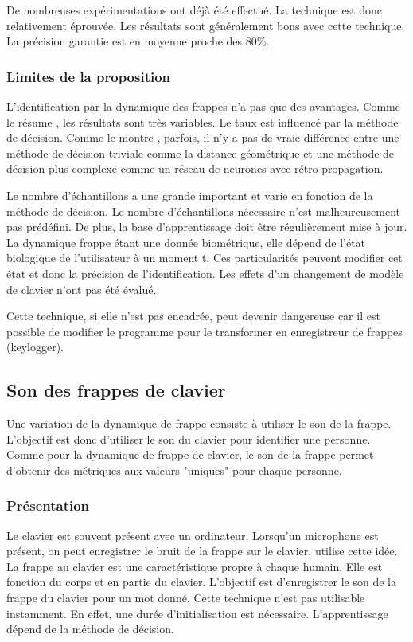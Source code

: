 \documentclass[conference,compsoc]{IEEEtran}
\begin{document}
De nombreuses expérimentations ont déjà été effectué. La technique est donc relativement éprouvée. Les résultats sont généralement bons avec cette technique. La précision garantie est en moyenne proche des 80\%.

\subsubsection{Limites de la proposition}
L'identification par la dynamique des frappes n'a pas que des avantages. Comme le résume \cite{1341408}, les résultats sont très variables. Le taux est influencé par la méthode de décision. Comme le montre \cite{brown1993user}, parfois, il n'y a pas de vraie différence entre une méthode de décision triviale comme la distance géométrique et une méthode de décision plus complexe comme un réseau de neurones avec rétro-propagation.

Le nombre d'échantillons a une grande important et varie en fonction de la méthode de décision. Le nombre d'échantillons nécessaire n'est malheureusement pas prédéfini. De plus, la base d'apprentissage doit être régulièrement mise à jour. La dynamique frappe étant une donnée biométrique, elle dépend de l'état biologique de l'utilisateur à un moment t. Ces particularités peuvent modifier cet état et donc la précision de l'identification. Les effets d'un changement de modèle de clavier n'ont pas été évalué.

Cette technique, si elle n'est pas encadrée, peut devenir dangereuse car il est possible de modifier le programme pour le transformer en enregistreur de frappes (keylogger).

\subsection{Son des frappes de clavier} %
Une variation de la dynamique de frappe consiste à utiliser le son de la frappe. L'objectif est donc d'utiliser le son du clavier pour identifier une personne. Comme pour la dynamique de frappe de clavier, le son de la frappe permet d'obtenir des métriques aux valeurs "uniques" pour chaque personne.

\subsubsection{Présentation}
Le clavier est souvent présent avec un ordinateur. Lorsqu'un microphone est présent, on peut enregistrer le bruit de la frappe sur le clavier. \cite{7477360} utilise cette idée. La frappe au clavier est une caractéristique propre à chaque humain. Elle est fonction du corps et en partie du clavier. L'objectif est d'enregistrer le son de la frappe du clavier pour un mot donné.
Cette technique n'est pas utilisable instamment. En effet, une durée d'initialisation est nécessaire. L'apprentissage dépend de la méthode de décision.
\end{document}
